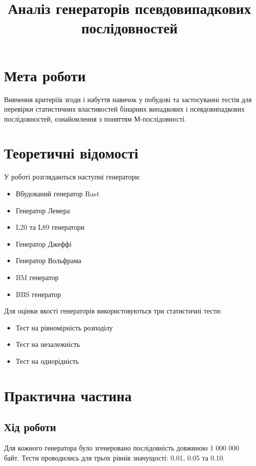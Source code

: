 \documentclass[12pt]{article}
\title{\textbf{Аналіз генераторів псевдовипадкових послідовностей}}
\author{}
\date{}
\begin{document}
\maketitle

\section{Мета роботи}
Вивчення критеріїв згоди і набуття навичок у побудові та застосуванні тестів для перевірки статистичних властивостей бінарних випадкових і псевдовипадкових послідовностей, ознайомлення з поняттям М-послідовності.

\section{Теоретичні відомості}
У роботі розглядаються наступні генератори:
\begin{itemize}
\item Вбудований генератор Rust
\item Генератор Лемера
\item L20 та L89 генератори
\item Генератор Джеффі
\item Генератор Вольфрама
\item BM генератор
\item BBS генератор
\end{itemize}

Для оцінки якості генераторів використовуються три статистичні тести:
\begin{itemize}
\item Тест на рівномірність розподілу
\item Тест на незалежність
\item Тест на однорідність
\end{itemize}

\section{Практична частина}
\subsection{Хід роботи}
Для кожного генератора було згенеровано послідовність довжиною 1 000 000 байт. Тести проводились для трьох рівнів значущості: 0.01, 0.05 та 0.10.
\newpage
\end{document}
